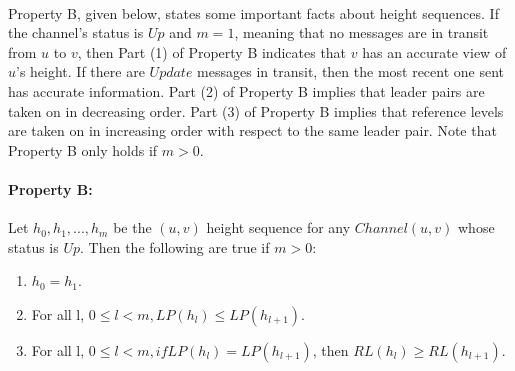 \paragraph{}Property B, given below, states some important facts about height sequences. If the channel's status is $Up$ and $m = 1$, meaning that no messages are in transit from $u$ to $v$, then Part (1) of Property B indicates that $v$ has an accurate view of $u$'s height. If there are $Update$ messages in transit, then the most recent one sent has accurate information. Part (2) of Property B implies that leader pairs are taken on in decreasing order. Part (3) of Property B implies that reference levels are taken on in increasing order with respect to the same leader pair. Note that Property B only holds if $m > 0$.
\paragraph{Property B:}Let $h_0, h_1, ... , h_m$ be the $(u, v)$ height sequence for any $Channel(u, v)$ whose status is $Up$. Then the following are true if $m > 0$:
\begin{enumerate}
	\item $h_0 = h_1$.
	\item For all l, $0 \leq l < m, LP(h_l ) \leq LP(h_{l+1} )$.
	\item For all l, $0 \leq l < m, if LP(h_l ) = LP(h_{l+1})$, then $RL(h_l) \geq RL(h_{l+1} )$.
\end{enumerate}
